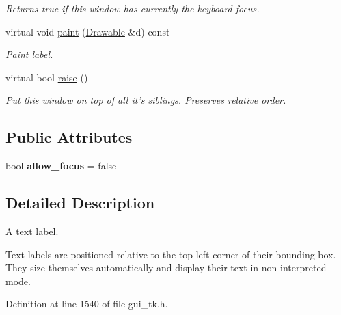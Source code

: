 \begin{DoxyCompactItemize}
\begin{DoxyCompactList}\small\item\em Returns {\ttfamily true} if this window has currently the keyboard focus. \end{DoxyCompactList}\item 
\hypertarget{classGUI_1_1Label_a797c2ce94314014b2775114a046c67b7}{virtual void \hyperlink{classGUI_1_1Label_a797c2ce94314014b2775114a046c67b7}{paint} (\hyperlink{classGUI_1_1Drawable}{Drawable} \&d) const }\label{classGUI_1_1Label_a797c2ce94314014b2775114a046c67b7}

\begin{DoxyCompactList}\small\item\em Paint label. \end{DoxyCompactList}\item 
virtual bool \hyperlink{classGUI_1_1Label_ae974cb75928cf5fcb0574d59d3b41a43}{raise} ()
\begin{DoxyCompactList}\small\item\em Put this window on top of all it's siblings. Preserves relative order. \end{DoxyCompactList}\end{DoxyCompactItemize}
\subsection*{Public Attributes}
\begin{DoxyCompactItemize}
\item 
\hypertarget{classGUI_1_1Label_a1b99913d11d7041a667648c395d5231f}{bool {\bfseries allow\-\_\-focus} = false}\label{classGUI_1_1Label_a1b99913d11d7041a667648c395d5231f}

\end{DoxyCompactItemize}


\subsection{Detailed Description}
A text label. 

Text labels are positioned relative to the top left corner of their bounding box. They size themselves automatically and display their text in non-\/interpreted mode. 

Definition at line 1540 of file gui\-\_\-tk.\-h.



